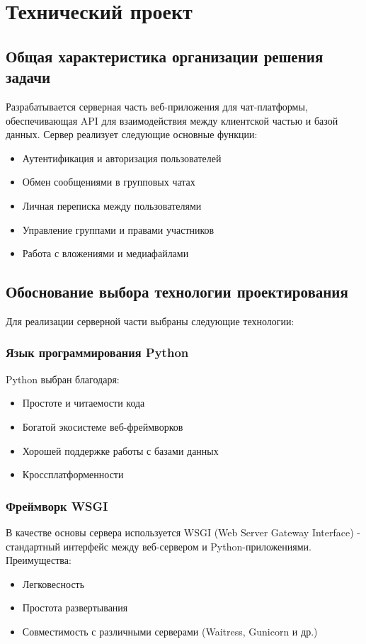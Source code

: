 \section{Технический проект}
\subsection{Общая характеристика организации решения задачи}

Разрабатывается серверная часть веб-приложения для чат-платформы, обеспечивающая API для взаимодействия между клиентской частью и базой данных. Сервер реализует следующие основные функции:
\begin{itemize}
	\item Аутентификация и авторизация пользователей
	\item Обмен сообщениями в групповых чатах
	\item Личная переписка между пользователями
	\item Управление группами и правами участников
	\item Работа с вложениями и медиафайлами
\end{itemize}

\subsection{Обоснование выбора технологии проектирования}

Для реализации серверной части выбраны следующие технологии:

\subsubsection{Язык программирования Python}

Python выбран благодаря:
\begin{itemize}
	\item Простоте и читаемости кода
	\item Богатой экосистеме веб-фреймворков
	\item Хорошей поддержке работы с базами данных
	\item Кроссплатформенности
\end{itemize}

\subsubsection{Фреймворк WSGI}

В качестве основы сервера используется WSGI (Web Server Gateway Interface) - стандартный интерфейс между веб-сервером и Python-приложениями. Преимущества:
\begin{itemize}
	\item Легковесность
	\item Простота развертывания
	\item Совместимость с различными серверами (Waitress, Gunicorn и др.)
\end{itemize}

